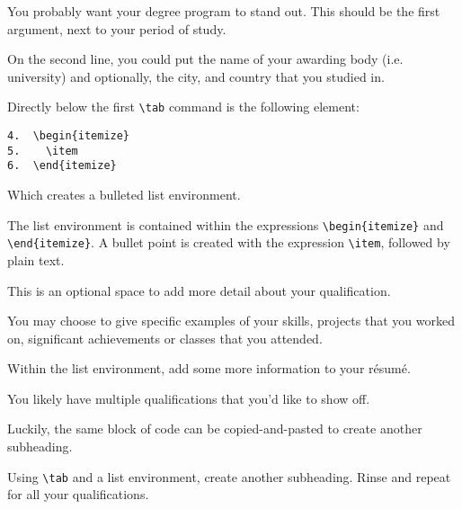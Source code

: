 You probably want your degree program to stand out. This should be the first argument, next to your period of study. \par

On the second line, you could put the name of your awarding body (i.e. university) and optionally, the city, and country that you studied in. \par

\clearpage

Directly below the first \lstinline|\tab| command is the following element: \par

\begin{lstlisting}
4.  \begin{itemize}
5.    \item
6.  \end{itemize}
\end{lstlisting}

Which creates a bulleted list environment. \par

The list environment is contained within the expressions \lstinline|\begin{itemize}| and \lstinline|\end{itemize}|. A bullet point is created with the expression \lstinline|\item|, followed by plain text. \par

This is an optional space to add more detail about your qualification. \par

You may choose to give specific examples of your skills, projects that you worked on, significant achievements or classes that you attended. \par

\begin{instrct}
Within the list environment, add some more information to your r\'esum\'e.
\end{instrct}

You likely have multiple qualifications that you'd like to show off. \par

Luckily, the same block of code can be copied-and-pasted to create another subheading. \par

\begin{ext}
Using \lstinline|\tab| and a list environment, create another subheading. Rinse and repeat for all your qualifications. 
\end{ext}

